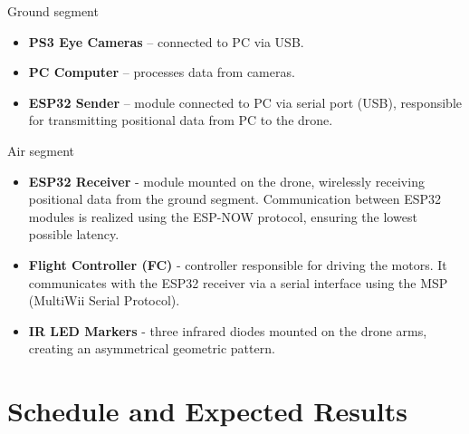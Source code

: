 \documentclass{EE-dyplom}
\begin{document}
Ground segment

\begin{itemize}
    \item \textbf{PS3 Eye Cameras} -- connected to PC via USB.
    \item \textbf{PC Computer} -- processes data from cameras.
    \item \textbf{ESP32 Sender} -- module connected to PC via serial port (USB), responsible for transmitting positional data from PC to the drone.
\end{itemize}


Air segment

\begin{itemize}
\item \textbf{ESP32 Receiver} - module mounted on the drone, wirelessly receiving positional data from the ground segment. Communication between ESP32 modules is realized using the ESP-NOW protocol, ensuring the lowest possible latency.
    
    \item \textbf{Flight Controller (FC)} - controller responsible for driving the motors. It communicates with the ESP32 receiver via a serial interface using the MSP (MultiWii Serial Protocol).
    
    \item \textbf{IR LED Markers} - three infrared diodes mounted on the drone arms, creating an asymmetrical geometric pattern.
\end{itemize}


\section{Schedule and Expected Results}
\end{document}
